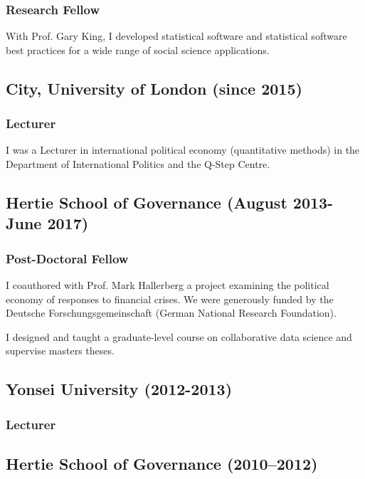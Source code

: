 \documentclass[a4paper]{article}
\begin{document}
\subsubsection*{Research Fellow}

With Prof. Gary King, I developed statistical software and statistical software best practices for a wide range of social science applications.

\subsection*{City, University of London (since 2015)}

\subsubsection*{Lecturer}

I was a Lecturer in international political economy (quantitative methods) in the Department of International Politics and the Q-Step Centre.

\subsection*{Hertie School of Governance (August 2013-June 2017)}

\subsubsection*{Post-Doctoral Fellow}

I coauthored with Prof. Mark Hallerberg a project examining the political economy of responses to financial crises. We were generously funded by the Deutsche Forschungsgemeinschaft (German National Research Foundation).\vspace{0.25cm}

\noindent I designed and taught a graduate-level course on collaborative data science and supervise masters theses.

\subsection*{Yonsei University (2012-2013)}
\subsubsection*{Lecturer}

\subsection*{Hertie School of Governance (2010--2012)}
\end{document}
